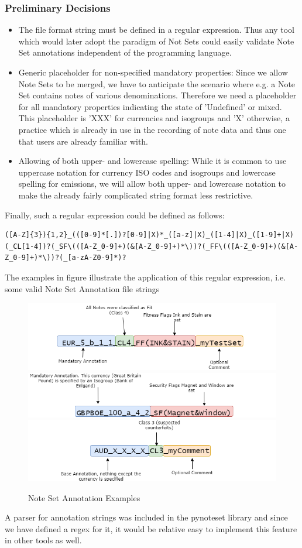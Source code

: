 \subsubsection{Preliminary Decisions}
\begin{itemize}
\item The file format string must be defined in a regular expression. Thus any tool which would later adopt the paradigm of Not Sets could easily validate Note Set annotations independent of the programming language.
\item Generic placeholder for non-specified mandatory properties: Since we allow Note Sets to be merged, we have to anticipate the scenario where e.g. a Note Set contains notes of various denominations. Therefore we need a placeholder for all mandatory properties indicating the state of 'Undefined' or mixed. This placeholder is 'XXX' for currencies and isogroups and 'X' otherwise, a practice which is already in use in the recording of note data and thus one that users are already familiar with. 
\item Allowing of both upper- and lowercase spelling: While it is common to use uppercase notation for currency ISO codes and isogroups and lowercase spelling for emissions, we will allow both upper- and lowercase notation to make the already fairly complicated string format less restrictive.
\end{itemize}
Finally, such a regular expression could be defined as follows:

\begin{center} 
\begin{verbatim}
([A-Z]{3}){1,2}_(([0-9]*[.])?[0-9]|X)*_([a-z]|X)_([1-4]|X)_([1-9]+|X)(_CL[1-4])?(_SF\(([A-Z_0-9]+)(&[A-Z_0-9]+)*\))?(_FF\(([A-Z_0-9]+)(&[A-Z_0-9]+)*\))?(_[a-zA-Z0-9]*)?
\end{verbatim}
\end{center} 
The examples in figure  illustrate the application of this regular expression, i.e. some valid Note Set Annotation file strings
\begin{figure}[!htb]
  \includegraphics[width=0.49\linewidth]{images/annotation_example1.png}
  \includegraphics[width=0.49\linewidth]{images/annotation_example2.png}
  \includegraphics[width=0.49\linewidth]{images/annotation_example3.png}
  \caption{Note Set Annotation Examples}\label{fig:ns_example}
\end{figure}

A parser for annotation strings was included in the pynoteset library and since we have defined a regex for it, it would be relative easy to implement this feature in other tools as well.


